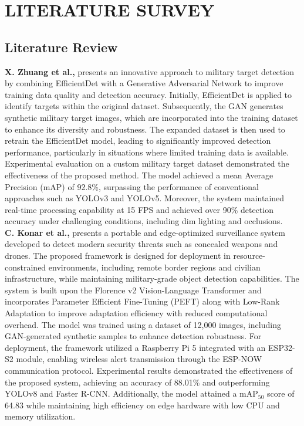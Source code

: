 \chapter{LITERATURE SURVEY}

\section{Literature Review}
\textbf{X. Zhuang et al.,} presents an innovative approach to military target detection by combining EfficientDet with a Generative Adversarial Network to improve training data quality and detection accuracy. Initially, EfficientDet is applied to identify targets within the original dataset. Subsequently, the GAN generates synthetic military target images, which are incorporated into the training dataset to enhance its diversity and robustness. The expanded dataset is then used to retrain the EfficientDet model, leading to significantly improved detection performance, particularly in situations where limited training data is available. Experimental evaluation on a custom military target dataset demonstrated the effectiveness of the proposed method. The model achieved a mean Average Precision (mAP) of 92.8\%, surpassing the performance of conventional approaches such as YOLOv3 and YOLOv5. Moreover, the system maintained real-time processing capability at 15 FPS and achieved over 90\% detection accuracy under challenging conditions, including dim lighting and occlusions. \textbf{\cite{base_paper}} \\

\textbf{C. Konar et al.,} presents a portable and edge-optimized surveillance system developed to detect modern security threats such as concealed weapons and drones. The proposed framework is designed for deployment in resource-constrained environments, including remote border regions and civilian infrastructure, while maintaining military-grade object detection capabilities. The system is built upon the Florence v2 Vision-Language Transformer and incorporates Parameter Efficient Fine-Tuning (PEFT) along with Low-Rank Adaptation to improve adaptation efficiency with reduced computational overhead. The model was trained using a dataset of 12,000 images, including GAN-generated synthetic samples to enhance detection robustness. For deployment, the framework utilized a Raspberry Pi 5 integrated with an ESP32-S2 module, enabling wireless alert transmission through the ESP-NOW communication protocol. Experimental results demonstrated the effectiveness of the proposed system, achieving an accuracy of 88.01\% and outperforming YOLOv8 and Faster R-CNN. Additionally, the model attained a mAP$_{50}$ score of 64.83 while maintaining high efficiency on edge hardware with low CPU and memory utilization. \textbf{\cite{supplementary_paper_1}} \\

